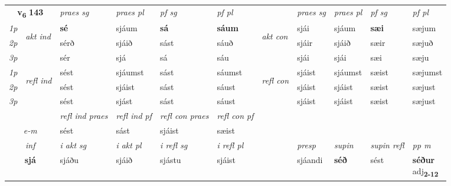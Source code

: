 \noindent
\begin{tabular}{lllllllllll} \toprule
\multicolumn{2}{c}{\textbf{v{\textsubscript{6}}} \Large{\textbf{143}}}  &  \textit{praes sg}  & \textit{praes pl}  &\textit{ pf sg} & \textit{pf pl} &  &  \textit{praes sg}  & \textit{praes pl}  & \textit{pf sg} & \textit{pf pl } \\*
	\cmidrule{3-6} \cmidrule{8-11}
 {\textit{1p}} & \multirow{3}{*}{\begin{turn}{90}\textit{akt ind}\end{turn}} & \textbf{sé} & sjáum & \textbf{sá} & \textbf{sáum} & \multirow{3}{*}{\begin{turn}{90}\textit{akt con}\end{turn}} &sjái & sjáum & \textbf{sæi} & sæjum\\*
 {\textit{2p}} &  &  sérð  & sjáið & sást & sáuð & & sjáir & sjáið & sæir & sæjuð \\*
{\textit{3p}} &  & sér & sjá & sá & sáu & & sjái & sjái& sæi & sæju \\*
\cmidrule{3-6} \cmidrule{8-11}
 {\textit{1p}} & \multirow{3}{*}{\begin{turn}{90}\textit{refl ind}\end{turn}}  & sést & sjáumst & sást & sáumst & \multirow{3}{*}{\begin{turn}{90}\textit{refl con}\end{turn}}  &sjáist & sjáumst & sæist & sæjumst \\*
 {\textit{2p}} &  & sést & sjáist & sást & sáust & &sjáist & sjáist & sæist & sæjust \\*
 {\textit{3p}}  & & sést & sjást & sást & sáust & & sjáist & sjáist& sæist & sæjust \\*
\cmidrule{3-6} \cmidrule{8-11}

 & & \textit{refl ind praes} & \textit{refl ind pf} & \textit{refl con praes} & \textit{refl con pf} \\*
 \multicolumn{2}{c}{ \textit{e-m} }& sést & sást & sjáist & sæist \\*

\cmidrule{3-11}
   \multicolumn{2}{c}{\textit{inf}}  & \textit{i akt sg} & \textit{i akt pl} & \textit{i refl sg} & \textit{i refl pl} && \textit{presp} & \textit{supin} & \textit{supin refl} & \textit{pp m} \\*
  \multicolumn{2}{c}{\textbf{sjá}} & sjáðu  & sjáið & sjástu & sjáist && sjáandi &  \textbf{séð} & sést & \specialcell{\textbf{séður} \\ adj\textbf{\textsubscript{2-12}}} \\*
\end{tabular}

